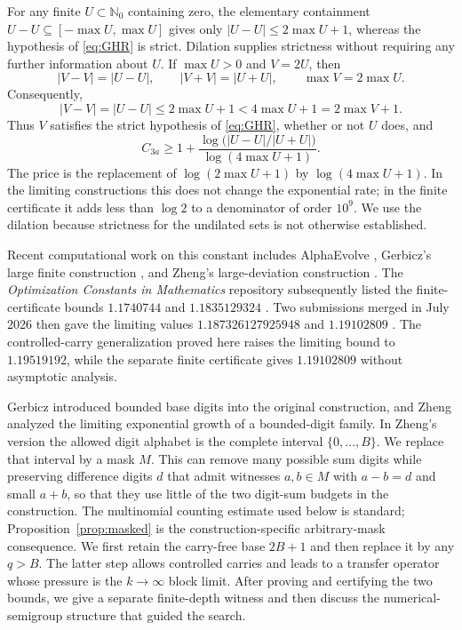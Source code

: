\documentclass[11pt]{article}
\newcommand{\N}{\mathbb{N}_0}
\newcommand{\card}[1]{\lvert #1\rvert}
\begin{document}
For any finite $U\subset\N$ containing zero, the elementary containment
$U-U\subseteq[-\max U,\max U]$ gives only
$\card{U-U}\le2\max U+1$, whereas the hypothesis of \eqref{eq:GHR} is
strict.  Dilation supplies strictness without requiring any further
information about $U$.  If $\max U>0$ and $V=2U$, then
\[
 \card{V-V}=\card{U-U},\qquad
 \card{V+V}=\card{U+U},\qquad
 \max V=2\max U.
\]
Consequently,
\[
 \card{V-V}=\card{U-U}\le 2\max U+1
 <4\max U+1=2\max V+1.
\]
Thus $V$ satisfies the strict hypothesis of \eqref{eq:GHR}, whether or not
$U$ does, and
\begin{equation}\label{eq:GHR-dilated}
 C_{3a}\ge
 1+\frac{\log\bigl(\card{U-U}/\card{U+U}\bigr)}
          {\log(4\max U+1)}.
\end{equation}
The price is the replacement of $\log(2\max U+1)$ by
$\log(4\max U+1)$.  In the limiting constructions this does not change the
exponential rate; in the finite certificate it adds less than $\log2$ to a
denominator of order $10^9$.  We use the dilation because strictness for the
undilated sets is not otherwise established.

Recent computational work on this constant includes AlphaEvolve
\cite{GeorgievEtAl2025}, Gerbicz's large finite construction
\cite{Gerbicz2025}, and Zheng's large-deviation construction
\cite{Zheng2025}. The \emph{Optimization Constants in Mathematics} repository
\cite{OptimizationConstants2026} subsequently listed the finite-certificate
bounds $1.1740744$ and $1.1835129324$ \cite{Griego2026,Mosaic2026}.
Two submissions merged in July 2026 then gave the limiting values
$1.187326127925948$ \cite{Numaro2026} and $1.19102809$
\cite{Kleinwaks2026}.  The controlled-carry generalization proved here raises
the limiting bound to $1.19519192$, while the separate finite certificate
gives $1.19102809$ without asymptotic analysis.

Gerbicz introduced bounded base digits into the original construction, and
Zheng analyzed the limiting exponential growth of a bounded-digit family.
In Zheng's version the allowed digit alphabet is the complete interval
$\{0,\ldots,B\}$. We replace that interval by a mask $M$. This can remove
many possible sum digits while preserving difference digits $d$ that admit
witnesses $a,b\in M$ with $a-b=d$ and small $a+b$, so that they use little
of the two digit-sum budgets in the construction. The multinomial counting
estimate used below is standard; Proposition~\ref{prop:masked} is the
construction-specific arbitrary-mask consequence.  We first retain the
carry-free base $2B+1$ and then replace it by any $q>B$.  The latter step
allows controlled carries and leads to a transfer operator whose pressure is
the $k\to\infty$ block limit.  After proving and certifying the two bounds, we
give a separate finite-depth witness and then discuss the numerical-semigroup
structure that guided the search.
\end{document}
